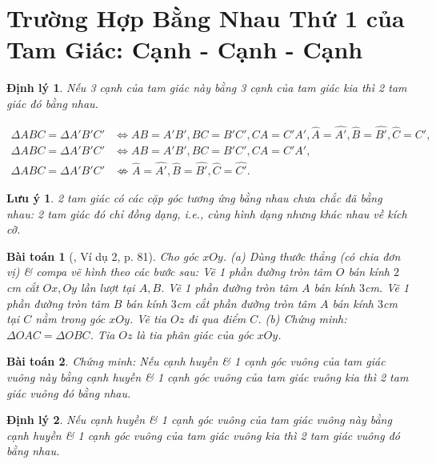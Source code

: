 \documentclass{article}
\newtheorem{baitoan}{Bài toán}
\newtheorem{dinhly}{Định lý}
\newtheorem{luuy}{Lưu ý}
\begin{document}

\section{Trường Hợp Bằng Nhau Thứ 1 của Tam Giác: Cạnh - Cạnh - Cạnh}

\begin{dinhly}
	Nếu 3 cạnh của tam giác này bằng 3 cạnh của tam giác kia thì 2 tam giác đó bằng nhau.
\end{dinhly}
\begin{align*}
	\Delta ABC = \Delta A'B'C'&\Leftrightarrow AB = A'B', BC = B'C', CA = C'A', \widehat{A} = \widehat{A'}, \widehat{B} = \widehat{B'}, \widehat{C} = \widehat{C'},\\
	\Delta ABC = \Delta A'B'C'&\Leftrightarrow AB = A'B', BC = B'C', CA = C'A',\\
	\Delta ABC = \Delta A'B'C'&\not\Leftrightarrow\widehat{A} = \widehat{A'}, \widehat{B} = \widehat{B'}, \widehat{C} = \widehat{C'}.
\end{align*}

\begin{luuy}
	2 tam giác có các cặp góc tương ứng bằng nhau chưa chắc đã bằng nhau: 2 tam giác đó chỉ đồng dạng, i.e., cùng hình dạng nhưng khác nhau về kích cỡ.
\end{luuy}

\begin{baitoan}[\cite{SGK_Toan_7_Canh_Dieu_tap_2}, Ví dụ 2, p. 81]
	Cho góc $xOy$. (a) Dùng thước thẳng (có chia đơn vị) \& compa vẽ hình theo các bước sau: Vẽ 1 phần đường tròn tâm $O$ bán kính $2$\emph{cm} cắt $Ox,Oy$ lần lượt tại $A,B$. Vẽ 1 phần đường tròn tâm $A$ bán kính $3$\emph{cm}. Vẽ 1 phần đường tròn tâm $B$ bán kính $3$\emph{cm} cắt phần đường tròn tâm $A$ bán kính $3$\emph{cm} tại $C$ nằm trong góc $xOy$. Vẽ tia $Oz$ đi qua điểm $C$. (b) Chứng minh: $\Delta OAC = \Delta OBC$. Tia $Oz$ là tia phân giác của góc $xOy$.
\end{baitoan}

\begin{baitoan}
	Chứng minh: Nếu cạnh huyền \& 1 cạnh góc vuông của tam giác vuông này bằng cạnh huyền \& 1 cạnh góc vuông của tam giác vuông kia thì 2 tam giác vuông đó bằng nhau.
\end{baitoan}

\begin{dinhly}
	Nếu cạnh huyền \& 1 cạnh góc vuông của tam giác vuông này bằng cạnh huyền \& 1 cạnh góc vuông của tam giác vuông kia thì 2 tam giác vuông đó bằng nhau.
\end{dinhly}
\end{document}
